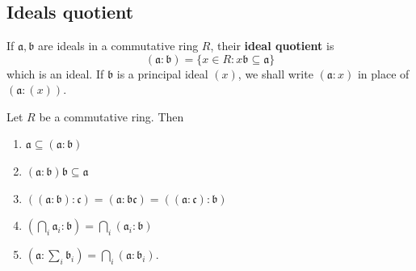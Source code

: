 \chapter{}

\section{Ideals quotient} %
\begin{definition}
    If $\mathfrak{a}, \mathfrak{b}$ are ideals in a commutative ring $R$, their \textbf{ideal quotient} is
    \begin{equation*}
        (\mathfrak{a}: \mathfrak{b})
        =
        \{x \in R: x \mathfrak{b} \subseteq \mathfrak{a}\}
    \end{equation*}
    which is an ideal.
    If $\mathfrak{b}$ is a principal ideal $(x)$, we shall write $(\mathfrak{a}: x)$ in place of $(\mathfrak{a}:(x))$.
\end{definition}

\begin{proposition}
    Let $R$ be a commutative ring. Then
    \begin{enumerate}
        \item
              $\mathfrak{a} \subseteq(\mathfrak{a}: \mathfrak{b})$

        \item
              $(\mathfrak{a}: \mathfrak{b}) \mathfrak{b} \subseteq \mathfrak{a}$

        \item
              $((\mathfrak{a}: \mathfrak{b}): \mathfrak{c})=(\mathfrak{a}: \mathfrak{b} \mathfrak{c})=((\mathfrak{a}: \mathfrak{c}): \mathfrak{b})$

        \item
              $\left(\bigcap_i \mathfrak{a}_i: \mathfrak{b}\right)=\bigcap_i\left(\mathfrak{a}_i: \mathfrak{b}\right)$

        \item
              $\left(\mathfrak{a}: \sum_i \mathfrak{b}_i\right)=\bigcap_i\left(\mathfrak{a}: \mathfrak{b}_i\right)$.
    \end{enumerate}
\end{proposition}




